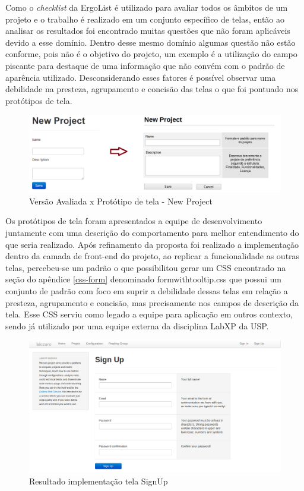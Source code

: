 Como o \textit{checklist} da ErgoList é utilizado para avaliar todos os âmbitos de um projeto e o trabalho é realizado em um conjunto específico de telas, então ao analisar os resultados foi encontrado muitas questões que não foram aplicáveis devido a esse domínio. Dentro desse mesmo domínio algumas questão não estão conforme, pois não é o objetivo do projeto, um exemplo é a utilização do campo piscante para destaque de uma informação que não convém com o padrão de aparência utilizado. Desconsiderando esses fatores é possível observar uma debilidade na presteza, agrupamento e concisão das telas o que foi pontuado nos protótipos de tela.

\graphicspath{{figuras/}}
\begin{figure}[h]
\centering
\includegraphics[width=1.0\textwidth]{PrototipoNewProject}
\caption{Versão Avaliada x Protótipo de tela - New Project}
\label{parallel-coordinate}
\end{figure}

Os protótipos de tela foram apresentados a equipe de desenvolvimento juntamente com uma descrição do comportamento para melhor entendimento do que seria realizado. Após refinamento da proposta foi realizado a implementação dentro da camada de front-end do projeto, ao replicar a funcionalidade as outras telas, percebeu-se um padrão o que possibilitou gerar um CSS encontrado na seção do apêndice \ref{css-form} denominado formwithtooltip.css que possui um conjunto de padrão com foco em suprir a debilidade dessas telas em relação a presteza, agrupamento e concisão, mas precisamente nos campos de descrição da tela. Esse CSS serviu como legado a equipe para aplicação em outros contexto, sendo já utilizado por uma equipe externa da disciplina LabXP da USP.

\graphicspath{{figuras/}}
\begin{figure}[h]
\centering
\includegraphics[width=1.0\textwidth]{TelaSignUp}
\caption{Resultado implementação tela SignUp}
\label{parallel-coordinate}
\end{figure}

